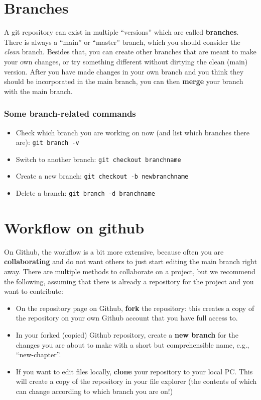 \documentclass[
  letterpaper,
  DIV=11,
  numbers=noendperiod,
  oneside]{scrreprt}
\providecommand{\tightlist}{%
  \setlength{\itemsep}{0pt}\setlength{\parskip}{0pt}}
\begin{document}
\begin{tcolorbox}
\section{Branches}\label{branches}

A git repository can exist in multiple ``versions'' which are called
\textbf{branches}. There is always a ``main'' or ``master'' branch,
which you should consider the \emph{clean} branch. Besides that, you can
create other branches that are meant to make your own changes, or try
something different without dirtying the clean (main) version. After you
have made changes in your own branch and you think they should be
incorporated in the main branch, you can then \textbf{merge} your branch
with the main branch.

\subsubsection{Some branch-related
commands}\label{some-branch-related-commands}

\begin{itemize}
\tightlist
\item
  Check which branch you are working on now (and list which branches
  there are): \texttt{git\ branch\ -v}
\item
  Switch to another branch: \texttt{git\ checkout\ branchname}
\item
  Create a new branch: \texttt{git\ checkout\ -b\ newbranchname}
\item
  Delete a branch: \texttt{git\ branch\ -d\ branchname}
\end{itemize}

\section{Workflow on github}\label{workflow-on-github}

On Github, the workflow is a bit more extensive, because often you are
\textbf{collaborating} and do not want others to just start editing the
main branch right away. There are multiple methods to collaborate on a
project, but we recommend the following, assuming that there is already
a repository for the project and you want to contribute:

\begin{itemize}
\item
  On the repository page on Github, \textbf{fork} the repository: this
  creates a copy of the repository on your own Github account that you
  have full access to.
\item
  In your forked (copied) Github repository, create a \textbf{new
  branch} for the changes you are about to make with a short but
  comprehensible name, e.g., ``new-chapter''.
\item
  If you want to edit files locally, \textbf{clone} your repository to
  your local PC. This will create a copy of the repository in your file
  explorer (the contents of which can change according to which branch
  you are on!)


\end{itemize}
\end{tcolorbox}
\end{document}
